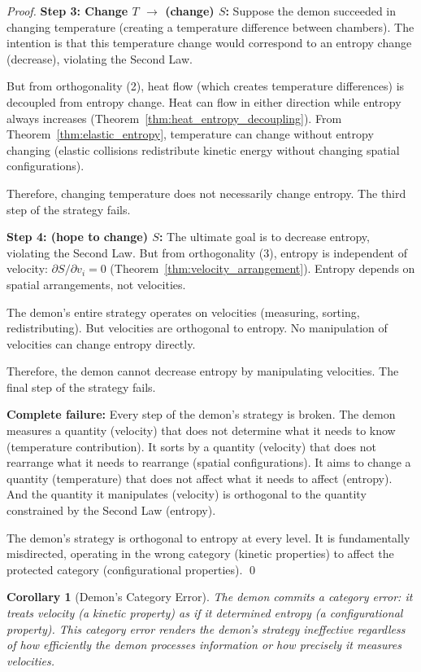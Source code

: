 \documentclass[12pt,a4paper]{article}
\newtheorem{corollary}[theorem]{Corollary}
\theoremstyle{definition}
\theoremstyle{remark}
\begin{document}
\begin{proof}
\textbf{Step 3: Change $T$ $\to$ (change) $S$:}
Suppose the demon succeeded in changing temperature (creating a temperature difference between chambers). The intention is that this temperature change would correspond to an entropy change (decrease), violating the Second Law.

But from orthogonality (2), heat flow (which creates temperature differences) is decoupled from entropy change. Heat can flow in either direction while entropy always increases (Theorem~\ref{thm:heat_entropy_decoupling}). From Theorem~\ref{thm:elastic_entropy}, temperature can change without entropy changing (elastic collisions redistribute kinetic energy without changing spatial configurations).

Therefore, changing temperature does not necessarily change entropy. The third step of the strategy fails.

\textbf{Step 4: (hope to change) $S$:}
The ultimate goal is to decrease entropy, violating the Second Law. But from orthogonality (3), entropy is independent of velocity: $\partial S / \partial v_i = 0$ (Theorem~\ref{thm:velocity_arrangement}). Entropy depends on spatial arrangements, not velocities.

The demon's entire strategy operates on velocities (measuring, sorting, redistributing). But velocities are orthogonal to entropy. No manipulation of velocities can change entropy directly.

Therefore, the demon cannot decrease entropy by manipulating velocities. The final step of the strategy fails.

\textbf{Complete failure:}
Every step of the demon's strategy is broken. The demon measures a quantity (velocity) that does not determine what it needs to know (temperature contribution). It sorts by a quantity (velocity) that does not rearrange what it needs to rearrange (spatial configurations). It aims to change a quantity (temperature) that does not affect what it needs to affect (entropy). And the quantity it manipulates (velocity) is orthogonal to the quantity constrained by the Second Law (entropy).

The demon's strategy is orthogonal to entropy at every level. It is fundamentally misdirected, operating in the wrong category (kinetic properties) to affect the protected category (configurational properties). \qed
\end{proof}

\begin{corollary}[Demon's Category Error]
\label{cor:demon_category_error}
The demon commits a category error: it treats velocity (a kinetic property) as if it determined entropy (a configurational property). This category error renders the demon's strategy ineffective regardless of how efficiently the demon processes information or how precisely it measures velocities.
\end{corollary}
\end{document}

